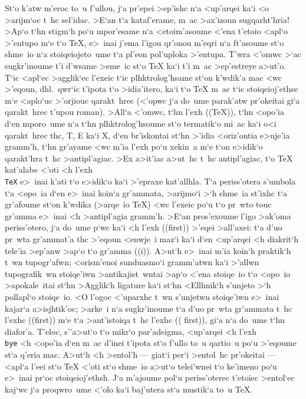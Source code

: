 St`o k'atw m'eroc to~u f'ullou, j`a pr'epei >ep'ishc n`a <up'arqei ka`i 
<o >arijm`oc t~hc sel'idac.  >E`an t`a kataf'erame, m~ac >ax'izoun
sug\-qarht'hria!  >Ap`o t`hn stigm`h po`u mpor'esame n`a <etoim'asoume
<'ena t'etoio <apl`o >'entupo m`e t`o {\rm \TeX}, e>~inai j'ema l'igou
qr'onou m'eqri n`a ft'asoume st`o shme~io n`a stoiqeiojeto~ume t`a
pl'eon pol'uploka >'entupa. T'wra <'omwc >`ac sugkr'inoume t'i d'wsame
>eme~ic st`o {\rm \TeX} ka`i t'i m~ac >ep'estreye a>ut'o.  T`ic <apl`ec
>agglik`ec l'exeic t`ic plh\-ktro\-log'h\-same st`on k'wdik'a mac <wc
>'eqoun, dhl.\ qwr`ic t'ipota t`o >idia'itero, ka`i t`o {\rm \TeX} m~ac
t`ic stoiqeioj'ethse m`e <aplo`uc >'orjiouc qarakt~hrec (<'opwc j`a
do~ume parak'atw pr'okeitai gi`a qarakt~hrec t'upou {\rm roman}). 
>All`a <'omwc, t`hn l'exh (({\rm \TeX})), t`hn <opo'ia d`en mporo~ume
n`a t`hn plhktrolog'hsoume st`o termatik`o mi~ac ka`i o<i qarakt~hrec
thc, {\rm T}, {\rm E} ka`i {\rm X}, d`en br'iskontai st`hn >'idia
<oriz'ontia e>uje'ia gramm'h, t`hn gr'ayame <wc m'ia l'exh po`u xekin~a
m`e t`on e>idik`o qarakt'hra t~hc >antipl'agiac.  >Ex a>it'iac a>ut~hc
t~hc antipl'agiac, t`o {\rm \TeX} kat'alabe <'oti <h l'exh {\tt \\TeX}
e>~inai k'ati t`o e>idik`o ka`i >'epraxe kat'allhla.  T`a periss'otera
s'umbola t`a <opo~ia d`en e>~inai koin`a gr'ammata, >arijmo`i >`h
shme~ia st'ixhc t`a gr'afoume st`on k'wdika (>arqe~io {\rm \TeX}) <wc
l'exeic po`u t`o pr~wto touc gr'amma e>~inai <h >antipl'agia gramm'h. 
>E`an pros'exoume l'igo >ak'oma periss'otero, j`a do~ume p`wc ka`i <h
l'exh (({\rm first})) >'eqei >all'axei: t`a d'uo pr~wta
gr'ammat'a thc >'eqoun <enwje~i ma\-z`i ka`i d`en <up'arqei <h diakrit`h
tele'ia >ep'anw >ap`o t`o gr'amma (({\rm i})). A>ut`h e>~inai m'ia
koin`h praktik`h t~wn tupogr'afwn; <orism'enoi sunduasmo`i gramm'atwn
ka`i >'allwn tupografik~wn stoiqe'iwn >anti\-kaji\-st~w\-ntai >ap`o
<'ena stoiqe~io t`o <opo~io >apokale~itai st`hn >Agglik`h {\rm ligature}
ka`i st`hn <Ellhnik`h {\tengs s'unjeto\/} >`h {\tengs pol\-la\-pl`o
stoiqe~io}. <O l'ogoc <'uparxhc t~wn s'unjetwn stoiqe'iwn e>~inai
kajar`a a>isjhtik'oc; >arke~i n`a sugkr'inoume t`a d'uo pr~wta gr'ammata
t~hc l'exhc (({\rm first})) m`e t`a >ant'istoiqa t~hc l'exhc (({\rm
f{}irst})), gi`a n`a do~ume t`hn diafor'a.  T'eloc, s''\NB a>ut`o t`o
mikr`o par'adeigma, <up'arqei <h l'exh {\tt \\bye} <h
<opo'ia d`en m~ac d'inei t'ipota st`o f'ullo to~u qartio~u po`u      
>'eqoume st`a q'eria mac.  A>ut`h <h >entol'h --- giat`i per`i >entol~hc
pr'okeitai --- <apl`a l'eei st`o {\rm \TeX} <'oti st`o shme~io a>ut`o
telei'wnei t`o ke'imeno po`u e>~inai pr`oc stoi\-qeio\-j'e\-thsh.  J`a
m'ajoume pol`u periss'oterec t'etoiec >entol`ec kaj`wc j`a proqwro~ume
<'olo ka`i baj'utera st`a mustik`a to~u {\rm \TeX}.

